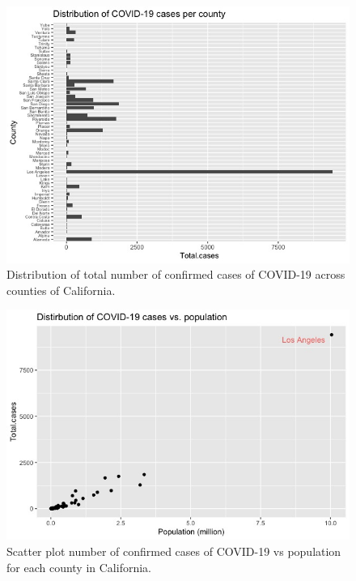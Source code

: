\documentclass[11pt,twocolumn]{asaproc}
\begin{document}
\begin{figure}[t]
\centering\includegraphics[scale=.30]{infected_per_county.jpeg}
\caption{Distribution of total number of confirmed cases of COVID-19 across counties of California.}
\label{fig:totcases}
\end{figure}

\begin{figure}[t]
\centering\includegraphics[scale=.31]{inf_vs_pop.jpeg}
\caption{Scatter plot number of confirmed cases of COVID-19 vs population for each county in California.}
\label{fig:infpop}
\end{figure}
\end{document}
